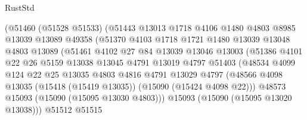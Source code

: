 \begin{lexlean}{RustStd}
\begin{coremodule}
                          (@51460
                            (@51528 @51533)
                            (@51443
                              @13013
                              @1718
                              @4106
                              @1480
                              @4803
                              @8985
                              @13039
                              @13089
                              @49358
                              (@51370
                                @4103
                                @1718
                                @1721
                                @1480
                                @13039
                                @13048
                                @4803
                                @13089
                                (@51461
                                  @4102
                                  @27
                                  @84
                                  @13039
                                  @13046
                                  @13003
                                  (@51386
                                    @4101
                                    @22
                                    @26
                                    @5159
                                    @13038
                                    @13045
                                    @4791
                                    @13019
                                    @4797
                                    @51403
                                    (@48534
                                      @4099
                                      @124
                                      @22
                                      @25
                                      @13035
                                      @4803
                                      @4816
                                      @4791
                                      @13029
                                      @4797
                                      (@48566
                                        @4098
                                        @13035
                                        (@15418 (@15419 @13035))
                                        (@15090 (@15424 @4098 @22)))
                                      @48573
                                      @15093
                                      (@15090 (@15095 @13030 @4803)))
                                    @15093
                                    (@15090 (@15095 @13020 @13038)))
                                  @51512
                                  @51515

\end{coremodule}
\end{lexlean}
